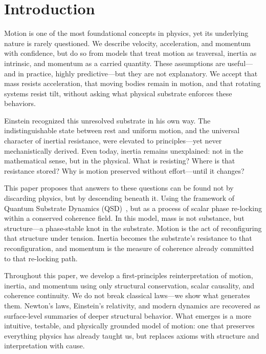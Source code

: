 \documentclass[entropy,article,submit,pdftex,moreauthors]{Definitions/mdpi}
\begin{document}

\section{Introduction}

Motion is one of the most foundational concepts in physics, yet its underlying nature is rarely questioned. We describe velocity, acceleration, and momentum with confidence, but do so from models that treat motion as traversal, inertia as intrinsic, and momentum as a carried quantity. These assumptions are useful---and in practice, highly predictive---but they are not explanatory. We accept that mass resists acceleration, that moving bodies remain in motion, and that rotating systems resist tilt, without asking what physical substrate enforces these behaviors.

Einstein recognized this unresolved substrate in his own way. The indistinguishable state between rest and uniform motion, and the universal character of inertial resistance, were elevated to principles---yet never mechanistically derived. Even today, inertia remains unexplained: not in the mathematical sense, but in the physical. What is resisting? Where is that resistance stored? Why is motion preserved without effort---until it changes?

This paper proposes that answers to these questions can be found not by discarding physics, but by descending beneath it. Using the framework of Quantum Substrate Dynamics (QSD)~\cite{bush2025,bush-planck-2025,bush-coherence,bush-planck-ep}, but as a process of scalar phase re-locking within a conserved coherence field. In this model, mass is not substance, but structure---a phase-stable knot in the substrate. Motion is the act of reconfiguring that structure under tension. Inertia becomes the substrate's resistance to that reconfiguration, and momentum is the measure of coherence already committed to that re-locking path.

Throughout this paper, we develop a first-principles reinterpretation of motion, inertia, and momentum using only structural conservation, scalar causality, and coherence continuity. We do not break classical laws---we show what generates them. Newton’s laws, Einstein’s relativity, and modern dynamics are recovered as surface-level summaries of deeper structural behavior. What emerges is a more intuitive, testable, and physically grounded model of motion: one that preserves everything physics has already taught us, but replaces axioms with structure and interpretation with cause.
\end{document}
